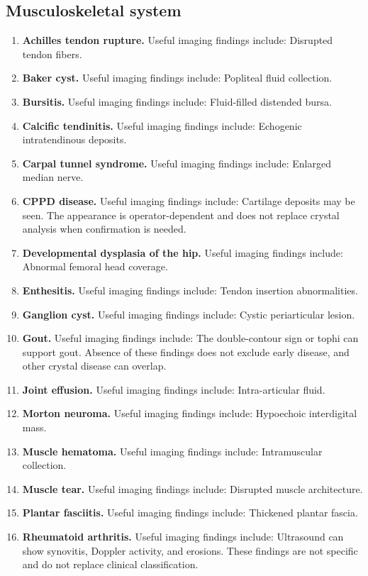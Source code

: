 \subsection{Musculoskeletal system}
\begin{enumerate}[leftmargin=*,itemsep=0.45em,topsep=0.4em]
\item \textbf{Achilles tendon rupture.} Useful imaging findings include: Disrupted tendon fibers.
\item \textbf{Baker cyst.} Useful imaging findings include: Popliteal fluid collection.
\item \textbf{Bursitis.} Useful imaging findings include: Fluid-filled distended bursa.
\item \textbf{Calcific tendinitis.} Useful imaging findings include: Echogenic intratendinous deposits.
\item \textbf{Carpal tunnel syndrome.} Useful imaging findings include: Enlarged median nerve.
\item \textbf{CPPD disease.} Useful imaging findings include: Cartilage deposits may be seen. The appearance is operator-dependent and does not replace crystal analysis when confirmation is needed.
\item \textbf{Developmental dysplasia of the hip.} Useful imaging findings include: Abnormal femoral head coverage.
\item \textbf{Enthesitis.} Useful imaging findings include: Tendon insertion abnormalities.
\item \textbf{Ganglion cyst.} Useful imaging findings include: Cystic periarticular lesion.
\item \textbf{Gout.} Useful imaging findings include: The double-contour sign or tophi can support gout. Absence of these findings does not exclude early disease, and other crystal disease can overlap.
\item \textbf{Joint effusion.} Useful imaging findings include: Intra-articular fluid.
\item \textbf{Morton neuroma.} Useful imaging findings include: Hypoechoic interdigital mass.
\item \textbf{Muscle hematoma.} Useful imaging findings include: Intramuscular collection.
\item \textbf{Muscle tear.} Useful imaging findings include: Disrupted muscle architecture.
\item \textbf{Plantar fasciitis.} Useful imaging findings include: Thickened plantar fascia.
\item \textbf{Rheumatoid arthritis.} Useful imaging findings include: Ultrasound can show synovitis, Doppler activity, and erosions. These findings are not specific and do not replace clinical classification.

\end{enumerate}
